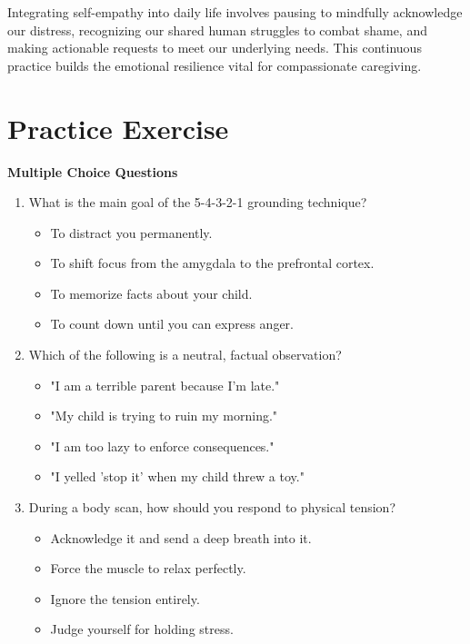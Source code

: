 \begin{keyinsight}
Integrating self-empathy into daily life involves pausing to mindfully acknowledge our distress, recognizing our shared human struggles to combat shame, and making actionable requests to meet our underlying needs.
This continuous practice builds the emotional resilience vital for compassionate caregiving.
\end{keyinsight}

\newpage
\section{Practice Exercise}
\begin{practiceexercise}
\textbf{Multiple Choice Questions}
\begin{enumerate}
  \item What is the main goal of the 5-4-3-2-1 grounding technique?
    \begin{itemize}
      \item[A)] To distract you permanently.
      \item[B)] To shift focus from the amygdala to the prefrontal cortex.
      \item[C)] To memorize facts about your child.
      \item[D)] To count down until you can express anger.
    \end{itemize}
  \item Which of the following is a neutral, factual observation?
    \begin{itemize}
      \item[A)] "I am a terrible parent because I'm late."
      \item[B)] "My child is trying to ruin my morning."
      \item[C)] "I am too lazy to enforce consequences."
      \item[D)] "I yelled 'stop it' when my child threw a toy."
    \end{itemize}
  \item During a body scan, how should you respond to physical tension?
    \begin{itemize}
      \item[A)] Acknowledge it and send a deep breath into it.
      \item[B)] Force the muscle to relax perfectly.
      \item[C)] Ignore the tension entirely.
      \item[D)] Judge yourself for holding stress.
    \end{itemize}
\end{enumerate}
\vspace{\baselineskip}


\end{practiceexercise}
